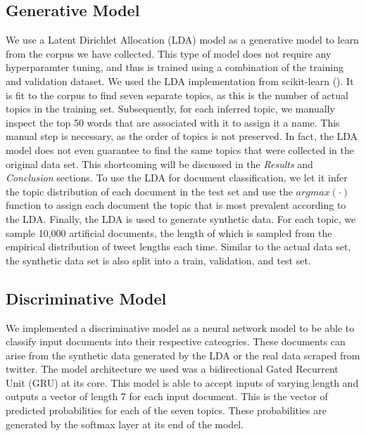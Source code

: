 \documentclass[11pt]{article}
\begin{document}
\subsection{Generative Model}
We use a Latent Dirichlet Allocation (LDA) model as a generative model to learn from the corpus we have collected. This type of model does not require any hyperparamter tuning, and thus is trained using a combination of the training and validation dataset. We used the LDA implementation from scikit-learn (\cite{sklearn}). It is fit to the corpus to find seven separate topics, as this is the number of actual topics in the training set. Subsequently, for each inferred topic, we manually inspect the top 50 words that are associated with it to assign it a name. This manual step is necessary, as the order of topics is not preserved. In fact, the LDA model does not even guarantee to find the same topics that were collected in the original data set. This shortcoming will be discussed in the \emph{Results} and \emph{Conclusion} sections. 
To use the LDA for document classification,  we let it infer the topic distribution of each document in the test set and use the $argmax(\cdot)$ function to assign each document the topic that is most prevalent according to the LDA.
Finally, the LDA is used to generate synthetic data. For each topic, we sample 10,000 artificial documents, the length of which is sampled from the empirical distribution of tweet lengths each time. Similar to the actual data set, the synthetic data set is also split into a train, validation, and test set.


\subsection{Discriminative Model}
We implemented a discriminative model as a neural network model to be able to classify input documents into their respective cateogries. These documents can arise from the synthetic data generated by the LDA or the real data scraped from twitter. The model architecture we used was a bidirectional Gated Recurrent Unit (GRU) at its core. This model is able to accept inputs of varying length and outputs a vector of length 7 for each input document. This is the vector of predicted probabilities for each of the seven topics. These probabilities are generated by the softmax layer at its end of the model.  
\end{document}

